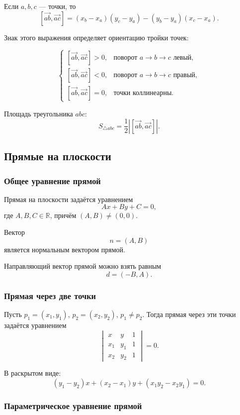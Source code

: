\documentclass[12pt,a4paper]{article}
\begin{document}
Если \(a,b,c\) — точки, то
\[
[\overrightarrow{ab},\overrightarrow{ac}]
=
(x_b-x_a)(y_c-y_a)-(y_b-y_a)(x_c-x_a).
\]

Знак этого выражения определяет ориентацию тройки точек:

\[
\begin{cases}
[\overrightarrow{ab},\overrightarrow{ac}]>0, & \text{поворот } a\to b\to c \text{ левый},\\
[\overrightarrow{ab},\overrightarrow{ac}]<0, & \text{поворот } a\to b\to c \text{ правый},\\
[\overrightarrow{ab},\overrightarrow{ac}]=0, & \text{точки коллинеарны}.
\end{cases}
\]

Площадь треугольника \(abc\):
\[
S_{\triangle abc}
=
\frac12
\left|
[\overrightarrow{ab},\overrightarrow{ac}]
\right|.
\]

\subsection{Прямые на плоскости}

\subsubsection{Общее уравнение прямой}

Прямая на плоскости задаётся уравнением
\[
Ax+By+C=0,
\]
где \(A,B,C\in\mathbb{R}\), причём \((A,B)\neq(0,0)\).

Вектор
\[
n=(A,B)
\]
является нормальным вектором прямой.

Направляющий вектор прямой можно взять равным
\[
d=(-B,A).
\]

\subsubsection{Прямая через две точки}

Пусть \(p_1=(x_1,y_1)\), \(p_2=(x_2,y_2)\), \(p_1\neq p_2\). Тогда прямая через эти точки задаётся уравнением
\[
\begin{vmatrix}
x & y & 1\\
x_1 & y_1 & 1\\
x_2 & y_2 & 1
\end{vmatrix}
=0.
\]

В раскрытом виде:
\[
(y_1-y_2)x+(x_2-x_1)y+(x_1y_2-x_2y_1)=0.
\]

\subsubsection{Параметрическое уравнение прямой}
\end{document}
